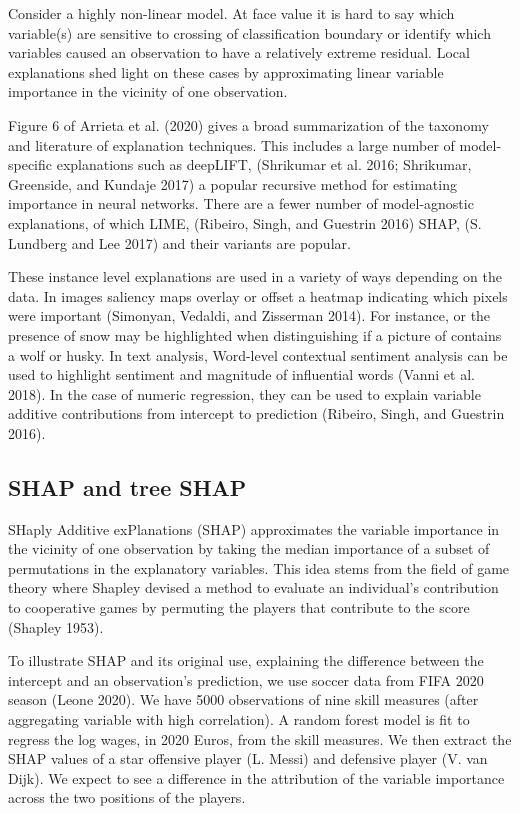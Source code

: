 \documentclass[
]{article}
\begin{document}
Consider a highly non-linear model. At face value it is hard to say which variable(s) are sensitive to crossing of classification boundary or identify which variables caused an observation to have a relatively extreme residual. Local explanations shed light on these cases by approximating linear variable importance in the vicinity of one observation.

Figure 6 of Arrieta et al. (2020) gives a broad summarization of the taxonomy and literature of explanation techniques. This includes a large number of model-specific explanations such as deepLIFT, (Shrikumar et al. 2016; Shrikumar, Greenside, and Kundaje 2017) a popular recursive method for estimating importance in neural networks. There are a fewer number of model-agnostic explanations, of which LIME, (Ribeiro, Singh, and Guestrin 2016) SHAP, (S. Lundberg and Lee 2017) and their variants are popular.

These instance level explanations are used in a variety of ways depending on the data. In images saliency maps overlay or offset a heatmap indicating which pixels were important (Simonyan, Vedaldi, and Zisserman 2014). For instance, or the presence of snow may be highlighted when distinguishing if a picture of contains a wolf or husky. In text analysis, Word-level contextual sentiment analysis can be used to highlight sentiment and magnitude of influential words (Vanni et al. 2018). In the case of numeric regression, they can be used to explain variable additive contributions from intercept to prediction (Ribeiro, Singh, and Guestrin 2016).

\hypertarget{shap-and-tree-shap}{%
\subsection{SHAP and tree SHAP}\label{shap-and-tree-shap}}

SHaply Additive exPlanations (SHAP) approximates the variable importance in the vicinity of one observation by taking the median importance of a subset of permutations in the explanatory variables. This idea stems from the field of game theory where Shapley devised a method to evaluate an individual's contribution to cooperative games by permuting the players that contribute to the score (Shapley 1953).

To illustrate SHAP and its original use, explaining the difference between the intercept and an observation's prediction, we use soccer data from FIFA 2020 season (Leone 2020). We have 5000 observations of nine skill measures (after aggregating variable with high correlation). A random forest model is fit to regress the log wages, in 2020 Euros, from the skill measures. We then extract the SHAP values of a star offensive player (L. Messi) and defensive player (V. van Dijk). We expect to see a difference in the attribution of the variable importance across the two positions of the players.
\end{document}
